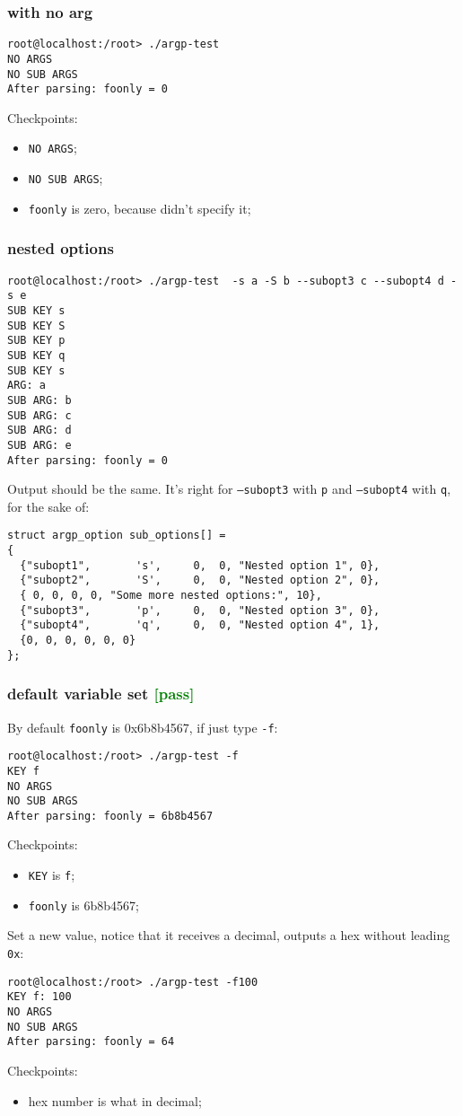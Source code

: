 \documentclass[a4paper]{report}
\begin{document}
\subsubsection{with no arg}
\begin{lstlisting}
root@localhost:/root> ./argp-test 
NO ARGS
NO SUB ARGS
After parsing: foonly = 0
\end{lstlisting}
Checkpoints:
\begin{itemize}
    \item {\tt NO ARGS};
    \item {\tt NO SUB ARGS};
    \item {\tt foonly} is zero, because didn't specify it;
\end{itemize}
\subsubsection{nested options}
\begin{lstlisting}
root@localhost:/root> ./argp-test  -s a -S b --subopt3 c --subopt4 d -s e
SUB KEY s
SUB KEY S
SUB KEY p
SUB KEY q
SUB KEY s
ARG: a
SUB ARG: b
SUB ARG: c
SUB ARG: d
SUB ARG: e
After parsing: foonly = 0
\end{lstlisting}
Output should be the same. It's right for {\tt --subopt3} with {\tt p} and 
{\tt --subopt4} with {\tt q}, for the sake of:
\begin{lstlisting}
struct argp_option sub_options[] =
{
  {"subopt1",       's',     0,  0, "Nested option 1", 0},
  {"subopt2",       'S',     0,  0, "Nested option 2", 0},
  { 0, 0, 0, 0, "Some more nested options:", 10},
  {"subopt3",       'p',     0,  0, "Nested option 3", 0},
  {"subopt4",       'q',     0,  0, "Nested option 4", 1},
  {0, 0, 0, 0, 0, 0}
};
\end{lstlisting}
\subsubsection{default variable set \textcolor{green}{[pass]}}
By default {\tt foonly} is 0x6b8b4567, if just type {\tt -f}:
\begin{lstlisting}
root@localhost:/root> ./argp-test -f
KEY f
NO ARGS
NO SUB ARGS
After parsing: foonly = 6b8b4567
\end{lstlisting}
Checkpoints:
\begin{itemize}
    \item {\tt KEY} is {\tt f};
    \item {\tt foonly} is 6b8b4567;
\end{itemize}
Set a new value, notice that it receives a decimal, outputs a hex without leading 
{\tt 0x}:
\begin{lstlisting}
root@localhost:/root> ./argp-test -f100
KEY f: 100
NO ARGS
NO SUB ARGS
After parsing: foonly = 64
\end{lstlisting}
Checkpoints:
\begin{itemize}
    \item hex number is what in decimal;
\end{itemize}
\end{document}
